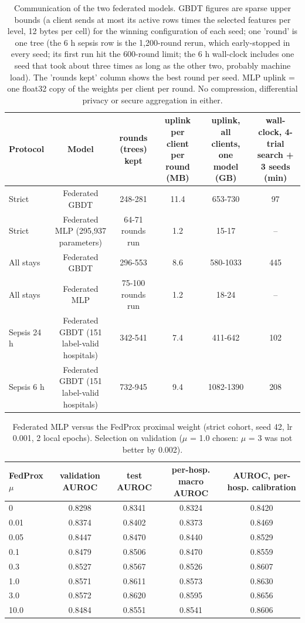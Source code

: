 \begin{table}[t]
\centering\small
\caption{Communication of the two federated models. GBDT figures are sparse upper bounds (a client sends at most its active rows times the selected features per level, 12 bytes per cell) for the winning configuration of each seed; one 'round' is one tree (the 6 h sepsis row is the 1,200-round rerun, which early-stopped in every seed; its first run hit the 600-round limit; the 6 h wall-clock includes one seed that took about three times as long as the other two, probably machine load). The 'rounds kept' column shows the best round per seed. MLP uplink = one float32 copy of the weights per client per round. No compression, differential privacy or secure aggregation in either.}\label{tab:cost}
\begin{tabular}{lccccc}
\toprule
Protocol & Model & rounds (trees) kept & uplink per client per round (MB) & uplink, all clients, one model (GB) & wall-clock, 4-trial search + 3 seeds (min) \\
\midrule
Strict & Federated GBDT & 248-281 & 11.4 & 653-730 & 97 \\
Strict & Federated MLP (295,937 parameters) & 64-71 rounds run & 1.2 & 15-17 & – \\
All stays & Federated GBDT & 296-553 & 8.6 & 580-1033 & 445 \\
All stays & Federated MLP & 75-100 rounds run & 1.2 & 18-24 & – \\
Sepsis 24 h & Federated GBDT (151 label-valid hospitals) & 342-541 & 7.4 & 411-642 & 102 \\
Sepsis 6 h & Federated GBDT (151 label-valid hospitals) & 732-945 & 9.4 & 1082-1390 & 208 \\
\bottomrule
\end{tabular}
\end{table}

\begin{table}[t]
\centering\small
\caption{Federated MLP versus the FedProx proximal weight (strict cohort, seed 42, lr 0.001, 2 local epochs). Selection on validation ($\mu$ = 1.0 chosen: $\mu$ = 3 was not better by 0.002).}\label{tab:fedprox}
\begin{tabular}{lcccc}
\toprule
FedProx $\mu$ & validation AUROC & test AUROC & per-hosp. macro AUROC & AUROC, per-hosp. calibration \\
\midrule
0 & 0.8298 & 0.8341 & 0.8324 & 0.8420 \\
0.01 & 0.8374 & 0.8402 & 0.8373 & 0.8469 \\
0.05 & 0.8447 & 0.8470 & 0.8440 & 0.8529 \\
0.1 & 0.8479 & 0.8506 & 0.8470 & 0.8559 \\
0.3 & 0.8527 & 0.8567 & 0.8526 & 0.8607 \\
1.0 & 0.8571 & 0.8611 & 0.8573 & 0.8630 \\
3.0 & 0.8572 & 0.8620 & 0.8595 & 0.8656 \\
10.0 & 0.8484 & 0.8551 & 0.8541 & 0.8606 \\
\bottomrule
\end{tabular}
\end{table}

